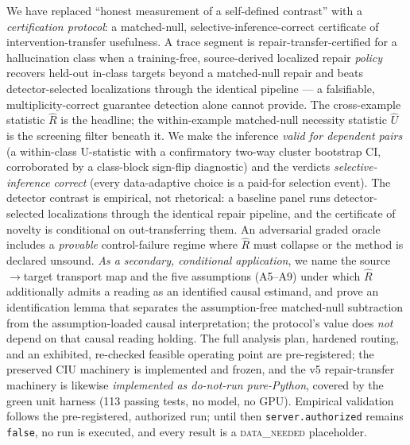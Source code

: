 \documentclass[11pt]{article}
\theoremstyle{plain}
\theoremstyle{definition}
\newcommand{\Uhat}{\widehat{U}}
\newcommand{\Rhat}{\widehat{R}}
\begin{document}
We have replaced ``honest measurement of a self-defined contrast'' with a
\emph{certification protocol}: a matched-null, selective-inference-correct
certificate of intervention-transfer usefulness. A trace segment is
repair-transfer-certified for a hallucination class when a training-free,
source-derived localized repair \emph{policy} recovers held-out in-class targets
beyond a matched-null repair and beats detector-selected localizations through the
identical pipeline --- a falsifiable, multiplicity-correct guarantee detection
alone cannot provide. The cross-example statistic $\Rhat$ is the headline; the
within-example matched-null necessity statistic $\Uhat$ is the screening filter
beneath it. We make the inference \emph{valid for dependent pairs} (a within-class
U-statistic with a confirmatory two-way cluster bootstrap CI, corroborated by a
class-block sign-flip diagnostic) and the verdicts \emph{selective-inference
correct} (every data-adaptive choice is a paid-for selection event). The detector
contrast is empirical, not rhetorical: a baseline panel runs detector-selected
localizations through the identical repair pipeline, and the certificate of novelty
is conditional on out-transferring them. An adversarial graded oracle includes a
\emph{provable} control-failure regime where $\Rhat$ must collapse or the method is
declared unsound. \emph{As a secondary, conditional application}, we name the
source$\to$target transport map and the five assumptions (A5--A9) under which
$\Rhat$ additionally admits a reading as an identified causal estimand, and prove
an identification lemma that separates the assumption-free matched-null subtraction
from the assumption-loaded causal interpretation; the protocol's value does
\emph{not} depend on that causal reading holding. The full analysis plan, hardened routing, and an exhibited,
re-checked feasible operating point are pre-registered; the preserved CIU machinery is
implemented and frozen, and the v5 repair-transfer machinery is likewise
\emph{implemented as do-not-run pure-Python}, covered by the green unit harness
(113 passing tests, no model, no GPU). Empirical validation follows the
pre-registered, authorized run; until then \texttt{server.authorized} remains
\texttt{false}, no run is executed, and every result is a \textsc{data\_needed}
placeholder.



\end{document}
